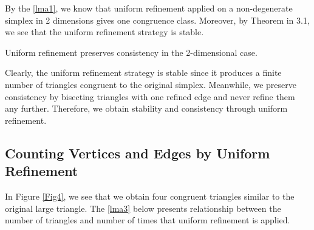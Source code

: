     By the \cref{lma1}, we know that uniform refinement applied on a non-degenerate simplex in 2 dimensions gives one congruence class. Moreover, by Theorem in 3.1, we see that the uniform refinement strategy is stable.

    \begin{lemma}
    Uniform refinement preserves consistency in the 2-dimensional case.
    \label{lma2}
    \end{lemma}


    Clearly, the uniform refinement strategy is stable since it produces a finite number of triangles congruent to the original simplex. Meanwhile, we preserve consistency by bisecting triangles with one refined edge and never refine them any further. Therefore, we obtain stability and consistency through uniform refinement.

    \subsection{Counting Vertices and Edges by Uniform Refinement}
    In Figure \ref{Fig4}, we see that we obtain four congruent triangles similar to the original large triangle. The \cref{lma3} below presents relationship between the number of triangles and number of times that uniform refinement is applied.

